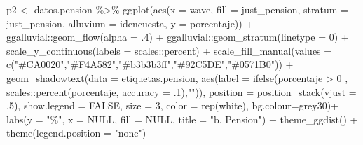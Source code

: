 \documentclass[
  12pt,
  letterpaper,
  DIV=11,
  numbers=noendperiod]{scrartcl}
\newenvironment{Shaded}{\begin{snugshade}}{\end{snugshade}}
\newcommand{\AttributeTok}[1]{\textcolor[rgb]{0.40,0.45,0.13}{#1}}
\newcommand{\ConstantTok}[1]{\textcolor[rgb]{0.56,0.35,0.01}{#1}}
\newcommand{\DecValTok}[1]{\textcolor[rgb]{0.68,0.00,0.00}{#1}}
\newcommand{\FunctionTok}[1]{\textcolor[rgb]{0.28,0.35,0.67}{#1}}
\newcommand{\NormalTok}[1]{\textcolor[rgb]{0.00,0.23,0.31}{#1}}
\newcommand{\OtherTok}[1]{\textcolor[rgb]{0.00,0.23,0.31}{#1}}
\newcommand{\SpecialCharTok}[1]{\textcolor[rgb]{0.37,0.37,0.37}{#1}}
\newcommand{\StringTok}[1]{\textcolor[rgb]{0.13,0.47,0.30}{#1}}
\begin{document}
\begin{Shaded}
\begin{Highlighting}[]
\NormalTok{p2 }\OtherTok{\textless{}{-}}\NormalTok{ datos.pension }\SpecialCharTok{\%\textgreater{}\%} 
  \FunctionTok{ggplot}\NormalTok{(}\FunctionTok{aes}\NormalTok{(}\AttributeTok{x =}\NormalTok{ wave, }\AttributeTok{fill =}\NormalTok{ just\_pension, }\AttributeTok{stratum =}\NormalTok{ just\_pension,}
             \AttributeTok{alluvium =}\NormalTok{ idencuesta, }\AttributeTok{y =}\NormalTok{ porcentaje)) }\SpecialCharTok{+}
\NormalTok{  ggalluvial}\SpecialCharTok{::}\FunctionTok{geom\_flow}\NormalTok{(}\AttributeTok{alpha =}\NormalTok{ .}\DecValTok{4}\NormalTok{) }\SpecialCharTok{+} 
\NormalTok{  ggalluvial}\SpecialCharTok{::}\FunctionTok{geom\_stratum}\NormalTok{(}\AttributeTok{linetype =} \DecValTok{0}\NormalTok{) }\SpecialCharTok{+}
  \FunctionTok{scale\_y\_continuous}\NormalTok{(}\AttributeTok{labels =}\NormalTok{ scales}\SpecialCharTok{::}\NormalTok{percent) }\SpecialCharTok{+} 
  \FunctionTok{scale\_fill\_manual}\NormalTok{(}\AttributeTok{values =}  \FunctionTok{c}\NormalTok{(}\StringTok{"\#CA0020"}\NormalTok{,}\StringTok{"\#F4A582"}\NormalTok{,}\StringTok{"\#b3b3b3ff"}\NormalTok{,}\StringTok{"\#92C5DE"}\NormalTok{,}\StringTok{"\#0571B0"}\NormalTok{)) }\SpecialCharTok{+}
  \FunctionTok{geom\_shadowtext}\NormalTok{(}\AttributeTok{data =}\NormalTok{ etiquetas.pension,}
                  \FunctionTok{aes}\NormalTok{(}\AttributeTok{label =} \FunctionTok{ifelse}\NormalTok{(porcentaje }\SpecialCharTok{\textgreater{}} \DecValTok{0}\NormalTok{ , scales}\SpecialCharTok{::}\FunctionTok{percent}\NormalTok{(porcentaje, }\AttributeTok{accuracy =}\NormalTok{ .}\DecValTok{1}\NormalTok{),}\StringTok{""}\NormalTok{)),}
                  \AttributeTok{position =} \FunctionTok{position\_stack}\NormalTok{(}\AttributeTok{vjust =}\NormalTok{ .}\DecValTok{5}\NormalTok{),}
                  \AttributeTok{show.legend =} \ConstantTok{FALSE}\NormalTok{,}
                  \AttributeTok{size =} \DecValTok{3}\NormalTok{,}
                  \AttributeTok{color =} \FunctionTok{rep}\NormalTok{(}\StringTok{\textquotesingle{}white\textquotesingle{}}\NormalTok{),}
                  \AttributeTok{bg.colour=}\StringTok{\textquotesingle{}grey30\textquotesingle{}}\NormalTok{)}\SpecialCharTok{+}
  \FunctionTok{labs}\NormalTok{(}\AttributeTok{y =} \StringTok{"\%"}\NormalTok{,}
       \AttributeTok{x =} \ConstantTok{NULL}\NormalTok{,}
       \AttributeTok{fill =} \ConstantTok{NULL}\NormalTok{,}
       \AttributeTok{title =} \StringTok{"b. Pension"}\NormalTok{) }\SpecialCharTok{+}
  \FunctionTok{theme\_ggdist}\NormalTok{() }\SpecialCharTok{+}
  \FunctionTok{theme}\NormalTok{(}\AttributeTok{legend.position =} \StringTok{"none"}\NormalTok{) }



\end{Highlighting}
\end{Shaded}
\end{document}
